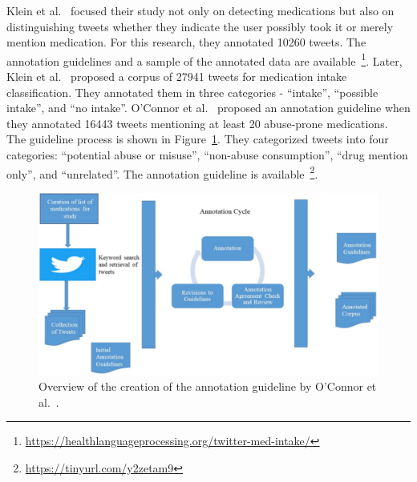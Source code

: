 Klein et al.~\cite{klein2017detecting} focused their study not only on detecting medications but also on distinguishing tweets whether they indicate the user possibly took it or merely mention medication. For this research, they annotated 10260 tweets. The annotation guidelines and a sample of the annotated data are available~\footnote{\url{https://healthlanguageprocessing.org/twitter-med-intake/}}. Later, Klein et al.~\cite{klein2019analysis} proposed a corpus of 27941 tweets for medication intake classification. They annotated them in three categories - “intake”, “possible intake”, and “no intake”. O’Connor et al.~\cite{o2020promoting} proposed an annotation guideline when they annotated 16443 tweets mentioning at least 20 abuse-prone medications. The guideline process is shown in Figure~\ref{fig:annotation-oconnor}. They categorized tweets into four categories: “potential abuse or misuse”, “non-abuse consumption”, “drug mention only”, and “unrelated”. The annotation guideline is available~\footnote{\url{https://tinyurl.com/y2zetam9}}.

\begin{figure}[h]
	\centering
	\includegraphics[width=0.99\linewidth]{Figures/d.png}
	\caption{Overview of the creation of the annotation guideline by O’Connor et al.~\cite{o2020promoting}.}
	\label{fig:annotation-oconnor}
\end{figure}